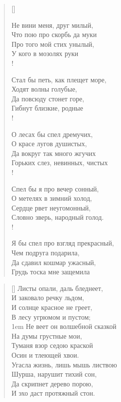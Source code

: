\settowidth{\versewidth}{\vinЧто пою про скорбь да муки\ldotst}
\begin{verse}[\versewidth]
\begin{altverse}
Не вини меня, друг милый,\\
    Что пою про скорбь да муки\ldotst\\
Про того мой стих унылый,\\
    У кого в мозолях руки\ldotst\\!

Стал бы петь, как плещет море,\\
    Ходят волны голубые,\\
Да повсюду стонет горе,\\
    Гибнут близкие, родные\ldotst\\!

О лесах бы спел дремучих,\\
    О красе лугов душистых,\\
Да вокруг так много жгучих\\
    Горьких слез, невинных, чистых\ldotst\\!

Спел бы я про вечер сонный,\\
    О метелях в зимний холод,\\
Сердце рвет неугомонный,\\
    Словно зверь, народный голод.\\!

Я бы спел про взгляд прекрасный,\\
    Чем подруга подарила,\\
Да сдавил кошмар ужасный,\\
    Грудь тоска мне защемила\ldotst
\end{altverse}
\end{verse}

\newpage
\vspace*{0cm}

\settowidth{\versewidth}{\vinНе веет он волшебной сказкой}
\begin{verse}[\versewidth]
Листы опали, даль бледнеет,\\
И заковало речку льдом,\\
И солнце красное не греет,\\
В лесу угрюмом и пустом;\\
\begingroup
\leftskip1em
\rightskip\leftskip
Не веет он волшебной сказкой\\
На думы грустные мои,\\
Туманя взор седою краской\\
Осин и тлеющей хвои.\\
\endgroup
Угасла жизнь, лишь мышь листвою\\
Шурша, нарушит тихий сон,\\
Да скрипнет дерево порою,\\
И эхо даст протяжный стон.
\end{verse}

